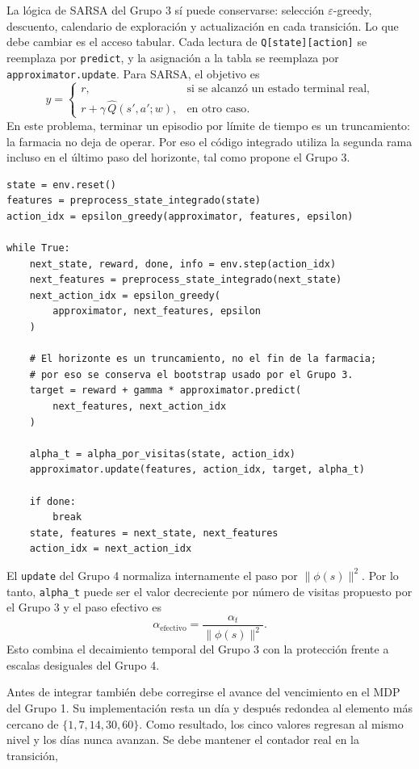 \documentclass[11pt,letterpaper]{article}
\begin{document}
La lógica de SARSA del Grupo 3 sí puede conservarse: selección
$\varepsilon$-greedy, descuento, calendario de exploración y actualización en cada
transición. Lo que debe cambiar es el acceso tabular. Cada lectura de
\texttt{Q[state][action]} se reemplaza por \texttt{predict}, y la asignación a la
tabla se reemplaza por \texttt{approximator.update}. Para SARSA, el objetivo es
\[
  y =
  \begin{cases}
    r, & \text{si se alcanzó un estado terminal real},\\
    r + \gamma\,\widehat Q(s',a';w), & \text{en otro caso}.
  \end{cases}
\]
En este problema, terminar un episodio por límite de tiempo es un truncamiento:
la farmacia no deja de operar. Por eso el código integrado utiliza la segunda
rama incluso en el último paso del horizonte, tal como propone el Grupo 3.

\begin{lstlisting}[caption={Núcleo de SARSA con aproximación lineal}]
state = env.reset()
features = preprocess_state_integrado(state)
action_idx = epsilon_greedy(approximator, features, epsilon)

while True:
    next_state, reward, done, info = env.step(action_idx)
    next_features = preprocess_state_integrado(next_state)
    next_action_idx = epsilon_greedy(
        approximator, next_features, epsilon
    )

    # El horizonte es un truncamiento, no el fin de la farmacia;
    # por eso se conserva el bootstrap usado por el Grupo 3.
    target = reward + gamma * approximator.predict(
        next_features, next_action_idx
    )

    alpha_t = alpha_por_visitas(state, action_idx)
    approximator.update(features, action_idx, target, alpha_t)

    if done:
        break
    state, features = next_state, next_features
    action_idx = next_action_idx
\end{lstlisting}

El \texttt{update} del Grupo 4 normaliza internamente el paso por
$\lVert\phi(s)\rVert^2$. Por lo tanto, \texttt{alpha\_t} puede ser el valor
decreciente por número de visitas propuesto por el Grupo 3 y el paso efectivo es
\[
  \alpha_{\mathrm{efectivo}}
  = \frac{\alpha_t}{\lVert\phi(s)\rVert^2}.
\]
Esto combina el decaimiento temporal del Grupo 3 con la protección frente a
escalas desiguales del Grupo 4.

Antes de integrar también debe corregirse el avance del vencimiento en el MDP
del Grupo 1. Su implementación resta un día y después redondea al elemento más
cercano de $\{1,7,14,30,60\}$. Como resultado, los cinco valores regresan al
mismo nivel y los días nunca avanzan. Se debe mantener el contador real en la
transición,
\end{document}
